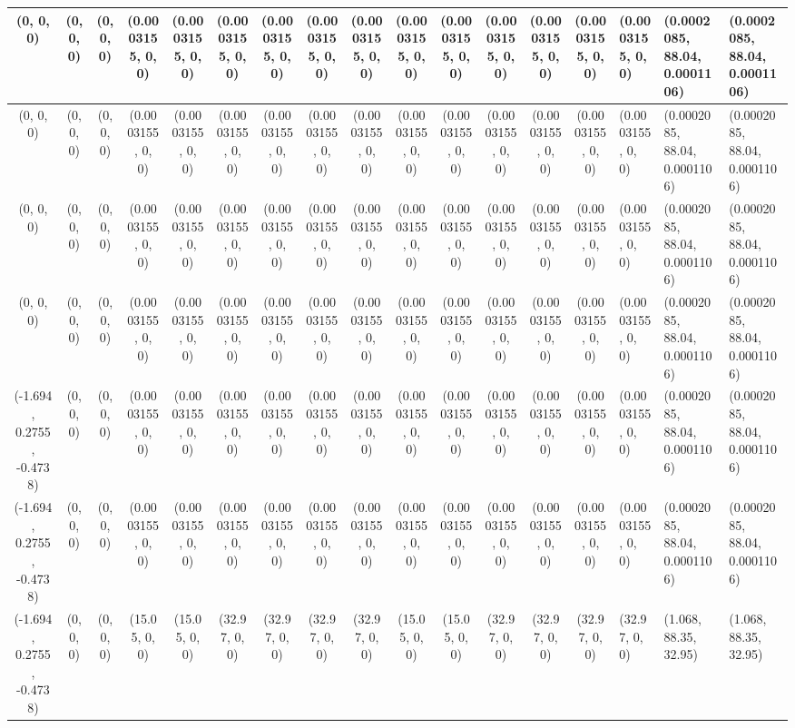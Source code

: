 \begin{tabular}{| c | c | c | c | c | c | c | c | c | c | c | c | c | c |}
	(0, 0, 0) & (0, 0, 0) & (0, 0, 0) & (0.0003155, 0, 0) & (0.0003155, 0, 0) & (0.0003155, 0, 0) & (0.0003155, 0, 0) & (0.0003155, 0, 0) & (0.0003155, 0, 0) & (0.0003155, 0, 0) & (0.0003155, 0, 0) & (0.0003155, 0, 0) & (0.0003155, 0, 0) & (0.0003155, 0, 0) & (0.0003155, 0, 0) & (0.0002085, 88.04, 0.0001106) & (0.0002085, 88.04, 0.0001106) \\ \hline
	(0, 0, 0) & (0, 0, 0) & (0, 0, 0) & (0.0003155, 0, 0) & (0.0003155, 0, 0) & (0.0003155, 0, 0) & (0.0003155, 0, 0) & (0.0003155, 0, 0) & (0.0003155, 0, 0) & (0.0003155, 0, 0) & (0.0003155, 0, 0) & (0.0003155, 0, 0) & (0.0003155, 0, 0) & (0.0003155, 0, 0) & (0.0003155, 0, 0) & (0.0002085, 88.04, 0.0001106) & (0.0002085, 88.04, 0.0001106) \\ \hline
	(0, 0, 0) & (0, 0, 0) & (0, 0, 0) & (0.0003155, 0, 0) & (0.0003155, 0, 0) & (0.0003155, 0, 0) & (0.0003155, 0, 0) & (0.0003155, 0, 0) & (0.0003155, 0, 0) & (0.0003155, 0, 0) & (0.0003155, 0, 0) & (0.0003155, 0, 0) & (0.0003155, 0, 0) & (0.0003155, 0, 0) & (0.0003155, 0, 0) & (0.0002085, 88.04, 0.0001106) & (0.0002085, 88.04, 0.0001106) \\ \hline
	(0, 0, 0) & (0, 0, 0) & (0, 0, 0) & (0.0003155, 0, 0) & (0.0003155, 0, 0) & (0.0003155, 0, 0) & (0.0003155, 0, 0) & (0.0003155, 0, 0) & (0.0003155, 0, 0) & (0.0003155, 0, 0) & (0.0003155, 0, 0) & (0.0003155, 0, 0) & (0.0003155, 0, 0) & (0.0003155, 0, 0) & (0.0003155, 0, 0) & (0.0002085, 88.04, 0.0001106) & (0.0002085, 88.04, 0.0001106) \\ \hline
	(-1.694, 0.2755, -0.4738) & (0, 0, 0) & (0, 0, 0) & (0.0003155, 0, 0) & (0.0003155, 0, 0) & (0.0003155, 0, 0) & (0.0003155, 0, 0) & (0.0003155, 0, 0) & (0.0003155, 0, 0) & (0.0003155, 0, 0) & (0.0003155, 0, 0) & (0.0003155, 0, 0) & (0.0003155, 0, 0) & (0.0003155, 0, 0) & (0.0003155, 0, 0) & (0.0002085, 88.04, 0.0001106) & (0.0002085, 88.04, 0.0001106) \\ \hline
	(-1.694, 0.2755, -0.4738) & (0, 0, 0) & (0, 0, 0) & (0.0003155, 0, 0) & (0.0003155, 0, 0) & (0.0003155, 0, 0) & (0.0003155, 0, 0) & (0.0003155, 0, 0) & (0.0003155, 0, 0) & (0.0003155, 0, 0) & (0.0003155, 0, 0) & (0.0003155, 0, 0) & (0.0003155, 0, 0) & (0.0003155, 0, 0) & (0.0003155, 0, 0) & (0.0002085, 88.04, 0.0001106) & (0.0002085, 88.04, 0.0001106) \\ \hline
	(-1.694, 0.2755, -0.4738) & (0, 0, 0) & (0, 0, 0) & (15.05, 0, 0) & (15.05, 0, 0) & (32.97, 0, 0) & (32.97, 0, 0) & (32.97, 0, 0) & (32.97, 0, 0) & (15.05, 0, 0) & (15.05, 0, 0) & (32.97, 0, 0) & (32.97, 0, 0) & (32.97, 0, 0) & (32.97, 0, 0) & (1.068, 88.35, 32.95) & (1.068, 88.35, 32.95) \\ \hline

\end{tabular}
